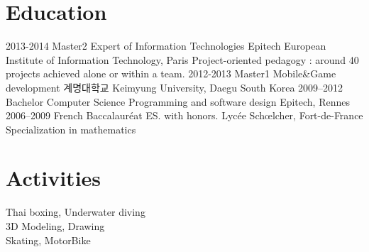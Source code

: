 \documentclass{emonides-cv}
\begin{document}
\section{Education}
\begin{entrylist}
  \entry
    {2013-2014}
    {Master2 {\normalfont  Expert of Information Technologies }}
    {Epitech European Institute of Information Technology, Paris} {Project-oriented pedagogy : around 40 projects achieved alone or within a team.}
  \entry
    {2012-2013}
    {Master1 {\normalfont  Mobile\&Game development }}
    { {\sffamily 계명대학교} Keimyung University, Daegu South Korea} {}
  \entry
    {2009–2012}
    {Bachelor  {\normalfont Computer Science Programming and software design}}
    {Epitech, Rennes} {}
  \entry
    {2006–2009}
    {French Baccalauréat ES. {\normalfont with honors. }}
    {Lycée Schœlcher, Fort-de-France} { Specialization in mathematics }
\end{entrylist}

\section{Activities}
  Thai boxing, Underwater diving\\
  3D Modeling, Drawing\\
  Skating, MotorBike
  
\end{document}
